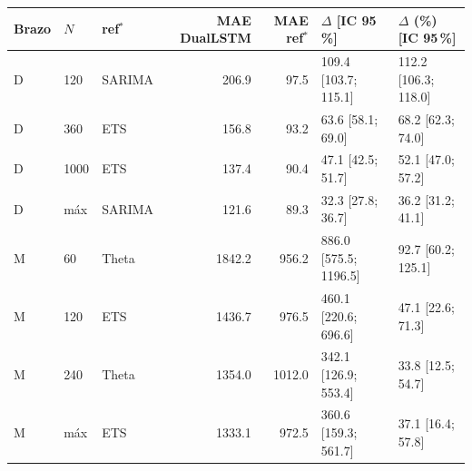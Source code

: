 \begin{tabular}{lllrrll}
\toprule
Brazo & $N$ & ref$^*$ & MAE DualLSTM & MAE ref$^*$ & $\Delta$ [IC 95\,\%] & $\Delta$ (\%) [IC 95\,\%] \\
\midrule
D & 120 & SARIMA & 206.9 & 97.5 & 109.4 [103.7; 115.1] & 112.2 [106.3; 118.0] \\
D & 360 & ETS & 156.8 & 93.2 & 63.6 [58.1; 69.0] & 68.2 [62.3; 74.0] \\
D & 1000 & ETS & 137.4 & 90.4 & 47.1 [42.5; 51.7] & 52.1 [47.0; 57.2] \\
D & máx & SARIMA & 121.6 & 89.3 & 32.3 [27.8; 36.7] & 36.2 [31.2; 41.1] \\
M & 60 & Theta & 1842.2 & 956.2 & 886.0 [575.5; 1196.5] & 92.7 [60.2; 125.1] \\
M & 120 & ETS & 1436.7 & 976.5 & 460.1 [220.6; 696.6] & 47.1 [22.6; 71.3] \\
M & 240 & Theta & 1354.0 & 1012.0 & 342.1 [126.9; 553.4] & 33.8 [12.5; 54.7] \\
M & máx & ETS & 1333.1 & 972.5 & 360.6 [159.3; 561.7] & 37.1 [16.4; 57.8] \\
\bottomrule
\end{tabular}
